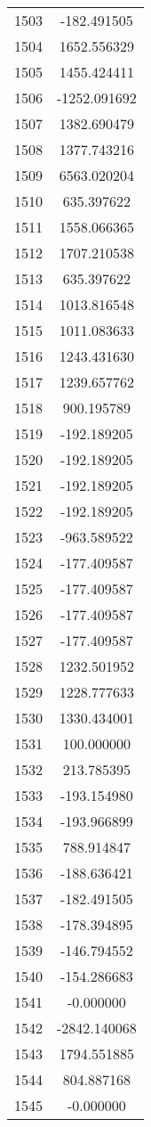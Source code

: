 \documentclass[12pt]{article}
\begin{document}
\begin{longtable}{@{}cc@{}}
1503 & -182.491505 \\
1504 & 1652.556329 \\
1505 & 1455.424411 \\
1506 & -1252.091692 \\
1507 & 1382.690479 \\
1508 & 1377.743216 \\
1509 & 6563.020204 \\
1510 & 635.397622 \\
1511 & 1558.066365 \\
1512 & 1707.210538 \\
1513 & 635.397622 \\
1514 & 1013.816548 \\
1515 & 1011.083633 \\
1516 & 1243.431630 \\
1517 & 1239.657762 \\
1518 & 900.195789 \\
1519 & -192.189205 \\
1520 & -192.189205 \\
1521 & -192.189205 \\
1522 & -192.189205 \\
1523 & -963.589522 \\
1524 & -177.409587 \\
1525 & -177.409587 \\
1526 & -177.409587 \\
1527 & -177.409587 \\
1528 & 1232.501952 \\
1529 & 1228.777633 \\
1530 & 1330.434001 \\
1531 & 100.000000 \\
1532 & 213.785395 \\
1533 & -193.154980 \\
1534 & -193.966899 \\
1535 & 788.914847 \\
1536 & -188.636421 \\
1537 & -182.491505 \\
1538 & -178.394895 \\
1539 & -146.794552 \\
1540 & -154.286683 \\
1541 & -0.000000 \\
1542 & -2842.140068 \\
1543 & 1794.551885 \\
1544 & 804.887168 \\
1545 & -0.000000 \\

\end{longtable}
\end{document}
